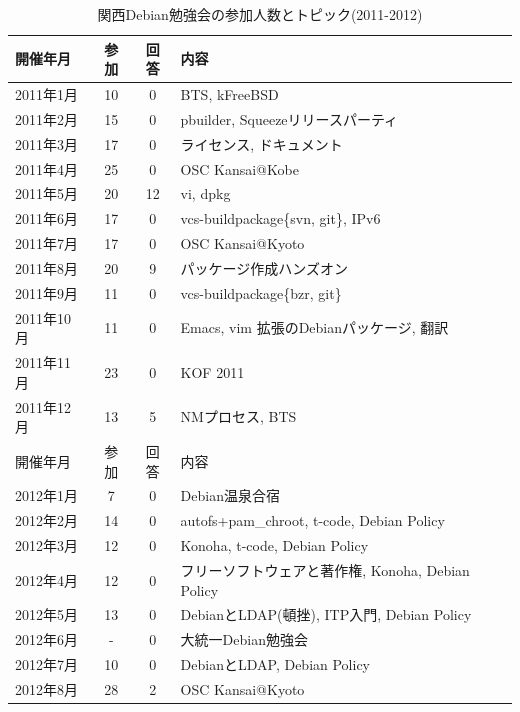 \documentclass[mingoth,a4paper]{jsarticle}
\begin{document}
\begin{table}
  \begin{minipage}{.5\linewidth}
    \caption{関西Debian勉強会の参加人数とトピック(2011-2012)}
    \begin{center}
      \begin{tabular}{|l|c|c|p{10em}|}
        \hline
        開催年月  & 参加 & 回答 & 内容 \\
        \hline
        2011年1月 &10    & 0    & BTS, kFreeBSD\\
        2011年2月 &15    & 0    & pbuilder, Squeezeリリースパーティ\\
        2011年3月 &17    & 0    & ライセンス, ドキュメント\\
        2011年4月 &25    & 0    & OSC Kansai@Kobe \\
        2011年5月 &20    &12    & vi, dpkg \\
        2011年6月 &17    & 0    & vcs-buildpackage\{svn, git\}, IPv6\\
        2011年7月 &17    & 0    & OSC Kansai@Kyoto \\
        2011年8月 &20    & 9    & パッケージ作成ハンズオン\\
        2011年9月 &11    & 0    & vcs-buildpackage\{bzr, git\}\\
        2011年10月&11    & 0    & Emacs, vim 拡張のDebianパッケージ, 翻訳\\
        2011年11月&23    & 0    & KOF 2011\\
        2011年12月&13    & 5    & NMプロセス, BTS\\
        \hline
        \hline
        開催年月  & 参加 & 回答 & 内容 \\
        \hline
        2012年1月 & 7    &0     & Debian温泉合宿 \\
        2012年2月 &14    &0     & autofs+pam\_chroot, t-code, Debian Policy \\
        2012年3月 &12    &0     & Konoha, t-code, Debian Policy \\
        2012年4月 &12    &0     & フリーソフトウェアと著作権, Konoha, Debian Policy \\
        2012年5月 &13    &0     & DebianとLDAP(頓挫), ITP入門, Debian Policy \\
        2012年6月 & -    &0     & 大統一Debian勉強会 \\
        2012年7月 &10    &0     & DebianとLDAP, Debian Policy \\
        2012年8月 &28    &2     & OSC Kansai@Kyoto \\

\end{tabular}
\end{center}
\end{minipage}
\end{table}
\end{document}
